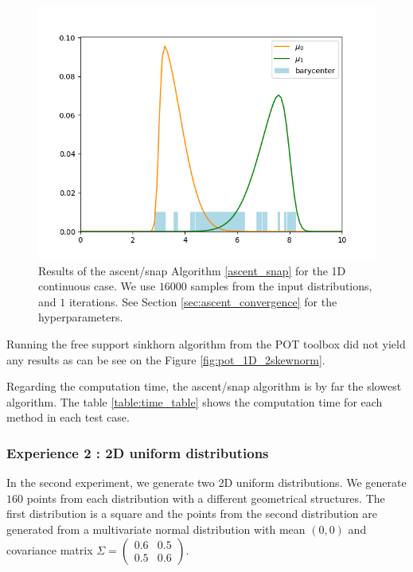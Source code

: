 \begin{figure}
    \centering
    \includegraphics[width=\textwidth]{figures/ascent_snap_1D_2skewnorm.png}
    \caption{Results of the ascent/snap Algorithm \ref{ascent_snap} for the 1D continuous case. We use $16000$ samples from the input distributions, and $1$ iterations. See Section \ref{sec:ascent_convergence} for the hyperparameters.}
    \label{fig:ascent_snap_1D_2skewnorm}
\end{figure}

Running the free support sinkhorn algorithm from the POT toolbox did not yield any results as can be see on the Figure \ref{fig:pot_1D_2skewnorm}.

Regarding the computation time, the ascent/snap algorithm is by far the slowest algorithm. The table \ref{table:time_table} shows the computation time for each method in each test case.

\subsubsection{Experience 2 : 2D uniform distributions}

In the second experiment, we generate two 2D uniform distributions. We generate $160$ points from each distribution with a different geometrical structures. The first distribution is a square and the points from the second distribution are generated from a multivariate normal distribution with mean $(0, 0)$ and covariance matrix
$
\Sigma = \left(\begin{array}{cc}
0.6 & 0.5 \\
0.5 & 0.6
\end{array}\right)
$.

